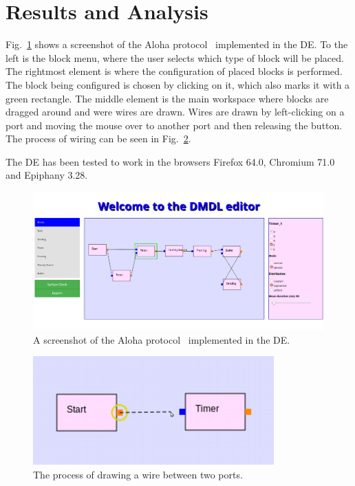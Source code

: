 \documentclass[journal,comsoc]{IEEEtran}
\begin{document}
\section{Results and Analysis}
Fig.~\ref{fig:full_editor} shows a screenshot of the Aloha protocol~\cite{aloha} implemented
in the DE. To the left is the block menu, where the user selects which type of block will be
placed. The rightmost element is where the configuration of placed blocks is performed. The
block being configured is chosen by clicking on it, which also marks it with a green rectangle.
The middle element is the main workspace where blocks are dragged around and were wires are
drawn. Wires are drawn by left-clicking on a port and moving the mouse over to another port and
then releasing the button. The process of wiring can be seen in Fig.~\ref{fig:wiring}.

The DE has been tested to work in the browsers Firefox 64.0, Chromium 71.0 and Epiphany 3.28.

\begin{figure}[!t]
    \centering
    \includegraphics[width=\columnwidth]{full_editor.png}
    \caption{A screenshot of the Aloha protocol~\cite{aloha} implemented in the DE.}
    \label{fig:full_editor}
\end{figure}

\begin{figure}[!t]
    \centering
    \includegraphics[width=\columnwidth]{wiring.png}
    \caption{The process of drawing a wire between two ports.}
    \label{fig:wiring}
\end{figure}
\end{document}

